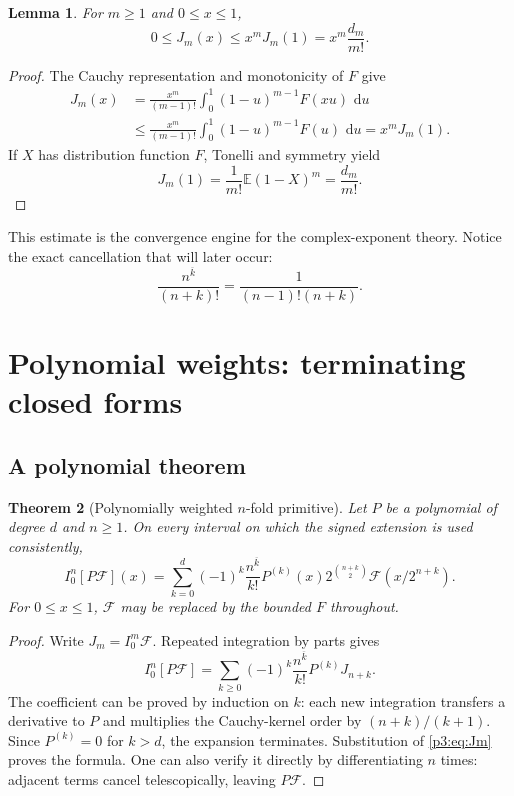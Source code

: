 \documentclass[11pt,oneside]{article}
\newtheorem{theorem}{Theorem}[section]
\newtheorem{lemma}[theorem]{Lemma}
\theoremstyle{definition}
\theoremstyle{remark}
\newcommand{\E}{\mathbb E}
\newcommand{\dd}{\,\mathrm d}
\newcommand{\rise}[2]{#1^{\overline{#2}}}
\newcommand{\1}{\mathbf 1}
\begin{document}
\begin{lemma}
\label{p3:lem:J-bound}
For $m\ge1$ and $0\le x\le1$,
\begin{equation}
 0\le J_m(x)\le x^mJ_m(1)=x^m\frac{d_m}{m!}.                 \label{p3:eq:J-bound}
\end{equation}
\end{lemma}

\begin{proof}
The Cauchy representation and monotonicity of $F$ give
\begin{align*}
 J_m(x)
 &=\frac{x^m}{(m-1)!}\int_0^1(1-u)^{m-1}F(xu)\,\dd u\\
 &\le\frac{x^m}{(m-1)!}\int_0^1(1-u)^{m-1}F(u)\,\dd u=x^mJ_m(1).
\end{align*}
If $X$ has distribution function $F$, Tonelli and symmetry yield
\[
 J_m(1)=\frac1{m!}\E(1-X)^m=\frac{d_m}{m!}.
\]
\end{proof}

This estimate is the convergence engine for the complex-exponent theory.  Notice the exact
cancellation that will later occur:
\begin{equation}
 \frac{\rise nk}{(n+k)!}=\frac1{(n-1)!(n+k)}.                 \label{p3:eq:rising-cancel}
\end{equation}

\section{Polynomial weights: terminating closed forms}
\label{p3:sec:polynomial}

\subsection{A polynomial theorem}

\begin{theorem}[Polynomially weighted $n$-fold primitive]
\label{p3:thm:poly-primitive}
Let $P$ be a polynomial of degree $d$ and $n\ge1$.  On every interval on which the signed
extension is used consistently,
\begin{equation}
 \boxed{
 I_0^n[P\mathcal F](x)
 =\sum_{k=0}^{d}(-1)^k\frac{\rise nk}{k!}P^{(k)}(x)
 2^{\binom{n+k}{2}}\mathcal F(x/2^{n+k}).}
 \label{p3:eq:poly-primitive}
\end{equation}
For $0\le x\le1$, $\mathcal F$ may be replaced by the bounded $F$ throughout.
\end{theorem}

\begin{proof}
Write $J_m=I_0^m\mathcal F$.  Repeated integration by parts gives
\[
 I_0^n[P\mathcal F]
 =\sum_{k\ge0}(-1)^k\frac{\rise nk}{k!}P^{(k)}J_{n+k}.
\]
The coefficient can be proved by induction on $k$: each new integration transfers a
derivative to $P$ and multiplies the Cauchy-kernel order by $(n+k)/(k+1)$.  Since
$P^{(k)}=0$ for $k>d$, the expansion terminates.  Substitution of \eqref{p3:eq:Jm} proves the
formula.  One can also verify it directly by differentiating $n$ times: adjacent terms
cancel telescopically, leaving $P\mathcal F$.
\end{proof}
\end{document}
